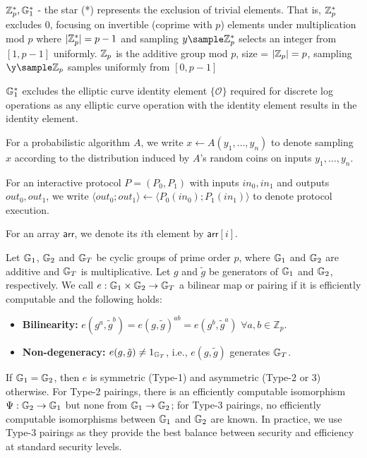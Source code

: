 $\mathbb{Z}_p^*, \mathbb{G}_1^*$ - the star (*) represents the exclusion of trivial elements. That is, $\mathbb{Z}_p^*$ excludes 0, focusing on invertible (coprime with $p$) elements under multiplication mod $p$ where $|\mathbb{Z}_p^*| = p-1$ and sampling $y \sample \Z_p^*$ selects an integer from $[1, p-1]$ uniformly. $\mathbb{Z}_p$ is the additive group mod $p$, size = $|\mathbb{Z}_p| = p$, sampling $\y \sample \Z_p$ samples uniformly from $[0, p-1]$

$\mathbb{G}_1^*$ excludes the elliptic curve identity element $\{\mathcal{O}\}$ required for discrete log operations as any elliptic curve operation with the identity element results in the identity element. 

For a probabilistic algorithm $A$, we write $x \leftarrow A(y_1,\ldots,y_n)$ to denote sampling $x$ according to the distribution induced by $A$'s random coins on inputs $y_1,\ldots,y_n$. 

For an interactive protocol $P = (P_0, P_1)$ with inputs $in_0, in_1$ and outputs $out_0, out_1$, we write $\langle out_0; out_1 \rangle \leftarrow \langle P_0(in_0); P_1(in_1) \rangle$ to denote protocol execution.

For an array $\mathsf{arr}$, we denote its $i$th element by $\mathsf{arr}[i]$.


\begin{definition}
Let $\mathbb{G}_1$, $\mathbb{G}_2$ and $\mathbb{G}_T$ be cyclic groups of prime order $p$, where $\mathbb{G}_1$ and $\mathbb{G}_2$ are additive and $\mathbb{G}_T$ is multiplicative. Let $g$ and $\tilde{g}$ be generators of $\mathbb{G}_1$ and $\mathbb{G}_2$, respectively. We call $e: \mathbb{G}_1 \times \mathbb{G}_2 \rightarrow \mathbb{G}_T$ a bilinear map or pairing if it is efficiently computable and the following holds:
\begin{itemize}
    \item \textbf{Bilinearity:} $e(g^a, \tilde{g}^b) = e(g, \tilde{g})^{ab} = e(g^b, \tilde{g}^a)$ $\forall a,b \in \mathbb{Z}_p$.
    \item \textbf{Non-degeneracy:} $e(g, \tilde{g}) \neq 1_{\mathbb{G}_T}$, i.e., $e(g, \tilde{g})$ generates $\mathbb{G}_T$.
\end{itemize}

\noindent If $\mathbb{G}_1 = \mathbb{G}_2$, then $e$ is symmetric (Type-1) and asymmetric (Type-2 or 3) otherwise. For Type-2 pairings, there is an efficiently computable isomorphism $\Psi: \mathbb{G}_2 \rightarrow \mathbb{G}_1$ but none from $\mathbb{G}_1 \rightarrow \mathbb{G}_2$; for Type-3 pairings, no efficiently computable isomorphisms between $\mathbb{G}_1$ and $\mathbb{G}_2$ are known. In practice, we use Type-3 pairings as they provide the best balance between security and efficiency at standard security levels.
\end{definition}


